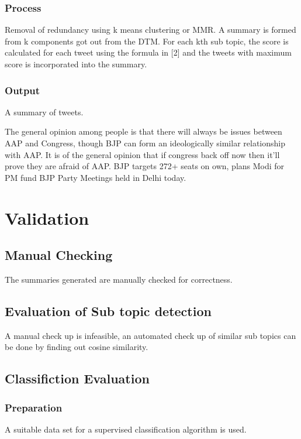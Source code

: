 \documentclass[conference]{IEEEtran}
\begin{document}
\subsubsection{\textbf{Process}}
\par Removal of redundancy using k means clustering or MMR. A summary is formed from k components got out from the DTM. For each kth sub topic, the score is calculated for each tweet using the formula in [2] and the tweets with maximum score is incorporated into the summary.

\subsubsection{\textbf{Output}}
A summary of tweets.\\
\par The general opinion among people is that there will always be issues between AAP and Congress, though BJP can form an ideologically similar relationship with AAP. It is of the general opinion that if congress back off now then it’ll prove they are afraid of AAP. BJP targets 272+ seats on own, plans Modi for PM fund BJP Party Meetings held in Delhi today.





\section{\textbf{Validation}}

\subsection{\textbf{Manual Checking}}
The summaries generated are manually checked for correctness.

\subsection{\textbf{Evaluation of Sub topic detection}}
\par A manual check up is infeasible, an automated check up of similar sub topics can be done by finding out cosine similarity.

\subsection{\textbf{Classifiction Evaluation}}

\subsubsection{\textbf{Preparation}}
A suitable data set for a supervised classification algorithm is used.
\end{document}
